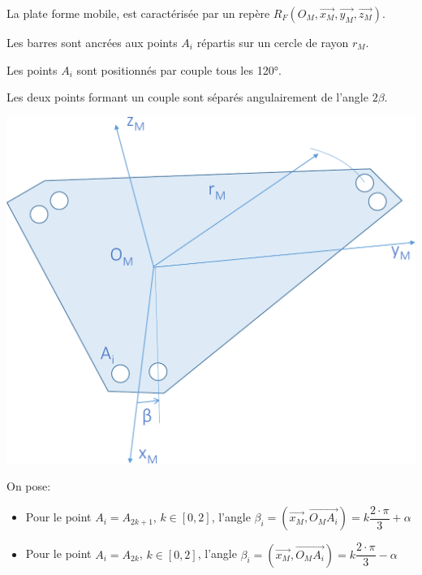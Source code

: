 \begin{minipage}{0.48\linewidth}
La plate forme mobile, est caractérisée par un repère $R_F(O_M,\overrightarrow{x_M},\overrightarrow{y_M},\overrightarrow{z_M})$. 

Les barres sont ancrées aux points $A_i$ répartis sur un cercle de rayon $r_M$.

Les points $A_i$ sont positionnés par couple tous les 120°.

Les deux points formant un couple sont séparés angulairement de l'angle $2\beta$.
\end{minipage}\hfill
\begin{minipage}{0.5\linewidth}
\begin{center}
 \includegraphics[width=0.7\linewidth]{img/Stewart_cin2}
\end{center}
\end{minipage}

On pose:

\begin{itemize}
 \item Pour le point $A_i=A_{2k+1}$, $k\in[0,2]$, l'angle $\beta_i=\left(\overrightarrow{x_M},\overrightarrow{O_MA_i}\right)=k\dfrac{2\cdot\pi}{3}+\alpha$
 \item Pour le point $A_i=A_{2k}$, $k\in[0,2]$, l'angle $\beta_i=\left(\overrightarrow{x_M},\overrightarrow{O_MA_i}\right)=k\dfrac{2\cdot\pi}{3}-\alpha$ 
\end{itemize}



